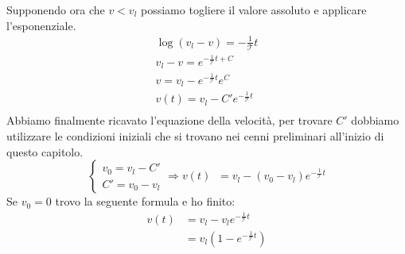 Supponendo ora che \(v < v_l\) possiamo togliere il valore assoluto e applicare l'esponenziale.
\begin{equation}\label{eq10}
    \begin{split}
    \log(v_l - v) = -\frac{1}{\mathcal{T}}t\\
    v_l - v = e^{-\frac{1}{\mathcal{T}}t + C}\\
    v = v_l - e^{-\frac{1}{\mathcal{T}}t}e^C\\
    v(t) = v_l - C'e^{-\frac{1}{\mathcal{T}}t}\\
    \end{split}
\end{equation}
Abbiamo finalmente ricavato l'equazione della velocità, per trovare \(C'\) dobbiamo utilizzare le condizioni iniziali che si trovano nei cenni preliminari all'inizio di questo capitolo.
\begin{equation}\label{eq11}
    \begin{cases}
    v_0 = v_l - C'\\
    C' = v_0 - v_l
    \end{cases} \Rightarrow v(t) \; \;= v_l - (v_0 - v_l)e^{-\frac{1}{\mathcal{T}}t}
\end{equation}
Se \(v_0 = 0\) trovo la seguente formula e ho finito:
\begin{equation}\label{eq12}
    \begin{split}
    v(t) &= v_l - v_l e^{-\frac{1}{\mathcal{T}}t}\\
         &= v_l (1 -  e^{-\frac{1}{\mathcal{T}}t})
    \end{split}
\end{equation}
